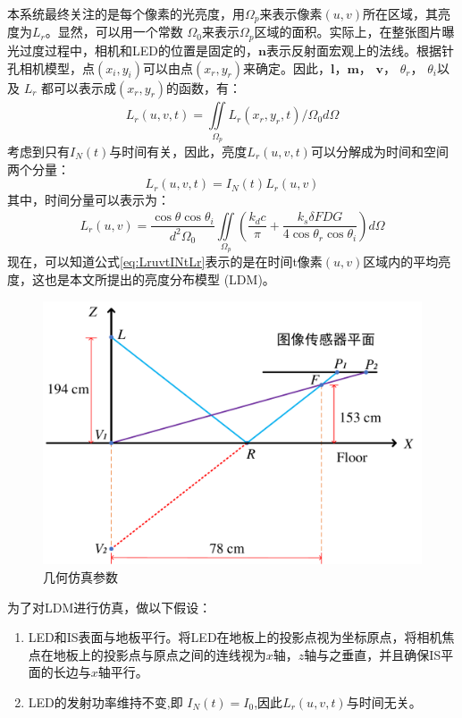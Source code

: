 本系统最终关注的是每个像素的光亮度，用$\Omega_{p}$来表示像素$(u,v)$所在区域，其亮度为$L_{r}$。显然，可以用一个常数 $\Omega_{0}$来表示$\Omega_{p}$区域的面积。实际上，在整张图片曝光过度过程中，相机和LED的位置是固定的，$\mathbf{n}$表示反射面宏观上的法线。根据针孔相机模型，点$(x_{i},y_{i})$可以由点$(x_{r},y_{r})$来确定。因此，$\mathbf{l}$，$\mathbf{m}$， $\mathbf{v}$， $\theta_{r}$， $\theta_{i}$以及 $L_{r}$ 都可以表示成$(x_{r},y_{r})$的函数，有：
  \begin{equation}\label{eq:Lruvt}
    L_{r}(u,v,t)= \iint\limits_{\Omega_{p}}^{}L_{r}(x_{r},y_{r},t)/\Omega_{0}d\Omega
  \end{equation}
考虑到只有$I_{N}(t)$与时间有关，因此，亮度$L_{r}(u,v,t)$可以分解成为时间和空间两个分量：
  \begin{equation}\label{eq:LruvtINtLr}
    L_{r}(u,v,t)= I_{N}(t)L_{r}(u,v)
  \end{equation}
其中，时间分量可以表示为： 
  \begin{equation}\label{eq:Lruv}
    L_{r}(u,v)= \frac{\cos\theta\cos\theta_{i}}{d^{2}\Omega_{0}}\iint\limits_{\Omega_{p}}^{}(\frac{k_{d}c}{\pi}+\frac{k_{s}\delta FDG}{4\cos\theta_{r}\cos\theta_{i}})d\Omega
  \end{equation}
现在，可以知道公式\ref{eq:LruvtINtLr}表示的是在时间t像素$(u, v)$区域内的平均亮度，这也是本文所提出的亮度分布模型 (LDM)。

\begin{figure}[!t]
  \centering
  \includegraphics[width=0.6\linewidth]{FIG/simulationenvironment.pdf}
  \caption{几何仿真参数}
  \label{fig:simulate_data}
\end{figure}
为了对LDM进行仿真，做以下假设：
\begin{enumerate}[topsep = 0 pt, itemsep= 0 pt, parsep=0pt, partopsep=0pt, leftmargin=20pt, itemindent=0pt, labelsep=6pt, label={(\arabic*)}] 
    \item{LED和IS表面与地板平行。将LED在地板上的投影点视为坐标原点，将相机焦点在地板上的投影点与原点之间的连线视为$x$轴，$z$轴与之垂直，并且确保IS平面的长边与$x$轴平行。}
    \item{LED的发射功率维持不变,即 $I_{N}(t)=I_{0}$,因此$L_{r}(u,v,t)$与时间无关。}
  \end{enumerate} 
  
